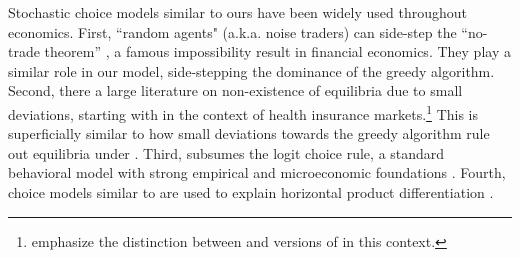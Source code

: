 Stochastic choice models similar to ours have been widely used throughout economics. First, ``random agents" (a.k.a. noise traders) can side-step the ``no-trade theorem'' \citep{Milgrom-Stokey-82}, a famous impossibility result in financial economics. They play a similar role in our model, side-stepping the dominance of the greedy algorithm.
Second, there a large literature on non-existence of equilibria due to small deviations, starting with \cite{Rothschild-Stiglitz-76} in the context of health insurance markets.\footnote{\cite{Veiga-Weyl-16,Azevedo-Gottlieb-17} emphasize the distinction between \HardMax and versions of \SoftMaxRandom in this context.}
This is superficially similar to how small deviations towards the greedy algorithm rule out equilibria under \HardMaxRandom.
Third, \SoftMaxRandom subsumes the logit choice rule, a standard behavioral model with strong empirical and microeconomic foundations
\citep[\eg][]{mosteller1951experimental, luce1959choice, mcfadden1974measurement, matvejka2015rational}.
Fourth, choice models similar to \SoftMaxRandom are used to explain  horizontal product differentiation \citep[\eg][]{Hotelling-29, Perloff-Salop-85}.


